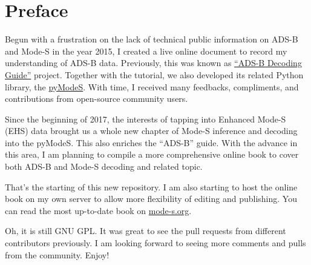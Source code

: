 \chapter*{Preface}\label{preface}
Begun with a frustration on the lack of technical public information on
ADS-B and Mode-S in the year 2015, I created a live online document to
record my understanding of ADS-B data. Previously, this was known as
\href{http://adsb-decode-guide.readthedocs.org/}{``ADS-B Decoding
Guide''} project. Together with the tutorial, we also developed its
related Python library, the
\href{https://github.com/junzis/pyModeS}{pyModeS}. With time, I received
many feedbacks, compliments, and contributions from open-source
community users.

Since the beginning of 2017, the interests of tapping into Enhanced
Mode-S (EHS) data brought us a whole new chapter of Mode-S inference and
decoding into the pyModeS. This also enriches the ``ADS-B'' guide. With
the advance in this area, I am planning to compile a more comprehensive
online book to cover both ADS-B and Mode-S decoding and related topic.

That's the starting of this new repository. I am also starting to host
the online book on my own server to allow more flexibility of editing
and publishing. You can read the most up-to-date book on
\href{http://mode-s.org}{mode-s.org}.

Oh, it is still GNU GPL. It was great to see the pull requests from
different contributors previously. I am looking forward to seeing more
comments and pulls from the community. Enjoy!
